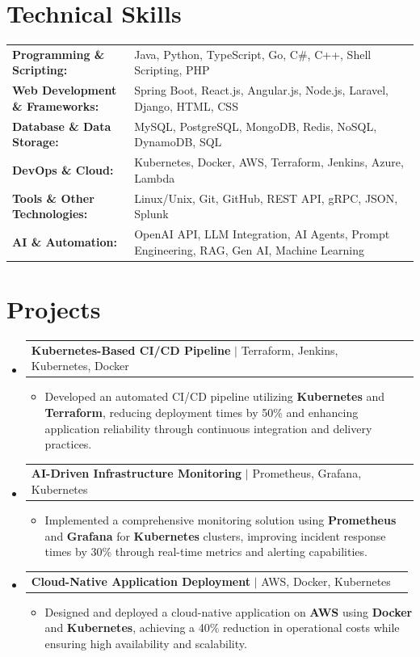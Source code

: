 \documentclass[letterpaper,10pt]{article}
\makeatletter
\newcommand{\resumeItem}[1]{
  \item{\fontsize{8pt}{9pt}\selectfont
    #1 \vspace{-3pt}
  }
}
\newcommand{\resumeProjectHeading}[2]{
    \item
    \begin{tabular*}{1.001\textwidth}{l@{\extracolsep{\fill}}r}
      \fontsize{8.5pt}{10pt}#1 & \textbf{\fontsize{8.5pt}{10pt} #2}\\
    \end{tabular*}\vspace{-7pt}
}
\newcommand{\resumeSubHeadingListStart}{\begin{itemize}[leftmargin=0pt, label={}]}
\newcommand{\resumeSubHeadingListEnd}{\end{itemize}}
\newcommand{\resumeItemListStart}{\begin{itemize}[leftmargin=*]}
\newcommand{\resumeItemListEnd}{\end{itemize}\vspace{-5pt}}
\makeatother
\begin{document}
\section{Technical Skills}
        \vspace{-14pt}
        \begin{table}[h]
            \fontsize{8pt}{9pt}\selectfont
            \begin{tabular}{p{0.3\linewidth} p{0.7\linewidth}}
                \textbf{Programming \& Scripting:} & Java, Python, TypeScript, Go, C\#, C++, Shell Scripting, PHP \\
                \textbf{Web Development \& Frameworks:} & Spring Boot, React.js, Angular.js, Node.js, Laravel, Django, HTML, CSS \\
                \textbf{Database \& Data Storage:} & MySQL, PostgreSQL, MongoDB, Redis, NoSQL, DynamoDB, SQL \\
                \textbf{DevOps \& Cloud:} & Kubernetes, Docker, AWS, Terraform, Jenkins, Azure, Lambda \\
                \textbf{Tools \& Other Technologies:} & Linux/Unix, Git, GitHub, REST API, gRPC, JSON, Splunk \\
                \textbf{AI \& Automation:} & OpenAI API, LLM Integration, AI Agents, Prompt Engineering, RAG, Gen AI, Machine Learning \\
            \end{tabular}
        \end{table}
 \vspace{-18pt}

\section{Projects}
    \vspace{-5pt}
    \resumeSubHeadingListStart
          \resumeProjectHeading
            {\textbf{Kubernetes-Based CI/CD Pipeline} $|$ Terraform, Jenkins, Kubernetes, Docker}{}
            \resumeItemListStart
                \resumeItem{Developed an automated CI/CD pipeline utilizing \textbf{Kubernetes} and \textbf{Terraform}, reducing deployment times by 50\% and enhancing application reliability through continuous integration and delivery practices.}
            \resumeItemListEnd
        \vspace{-12pt}
    
        \resumeProjectHeading
            {\textbf{AI-Driven Infrastructure Monitoring} $|$ Prometheus, Grafana, Kubernetes}{}
        \resumeItemListStart
                \resumeItem{Implemented a comprehensive monitoring solution using \textbf{Prometheus} and \textbf{Grafana} for \textbf{Kubernetes} clusters, improving incident response times by 30\% through real-time metrics and alerting capabilities.}
        \resumeItemListEnd
      \vspace{-12pt}
      \resumeProjectHeading
        {\textbf{Cloud-Native Application Deployment} $|$ AWS, Docker, Kubernetes}{}
    \resumeItemListStart
            \resumeItem{Designed and deployed a cloud-native application on \textbf{AWS} using \textbf{Docker} and \textbf{Kubernetes}, achieving a 40\% reduction in operational costs while ensuring high availability and scalability.}
    \resumeItemListEnd
    \resumeSubHeadingListEnd
\end{document}
